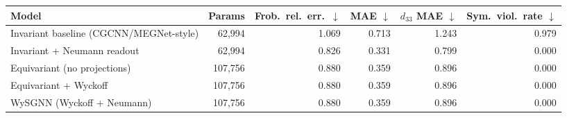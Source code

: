 \begin{tabular}{lrrrrr}
\toprule
Model & Params & Frob.\ rel.\ err.\ $\downarrow$ & MAE $\downarrow$ & $d_{33}$ MAE $\downarrow$ & Sym.\ viol.\ rate $\downarrow$ \\
\midrule
Invariant baseline (CGCNN/MEGNet-style) & 62,994 & 1.069 & 0.713 & 1.243 & 0.979 \\
Invariant + Neumann readout & 62,994 & 0.826 & 0.331 & 0.799 & 0.000 \\
Equivariant (no projections) & 107,756 & 0.880 & 0.359 & 0.896 & 0.000 \\
Equivariant + Wyckoff & 107,756 & 0.880 & 0.359 & 0.896 & 0.000 \\
WySGNN (Wyckoff + Neumann) & 107,756 & 0.880 & 0.359 & 0.896 & 0.000 \\
\bottomrule
\end{tabular}
